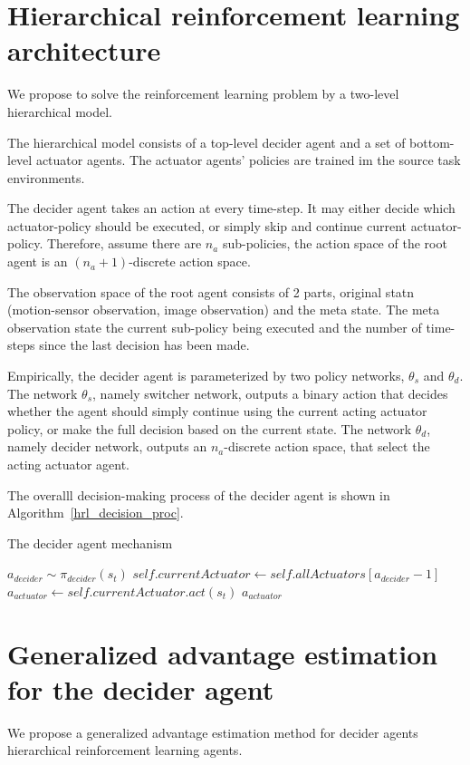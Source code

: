 
\section{Hierarchical reinforcement learning architecture}
We propose to solve the reinforcement learning problem by a two-level hierarchical model. 

The hierarchical model consists of a top-level decider agent and a set of bottom-level actuator agents. The actuator agents' policies are trained im the source task environments. 

The decider agent takes an action at every time-step. It may either decide which actuator-policy should be executed, or simply skip and continue current actuator-policy. Therefore, assume there are $n_a$ sub-policies, the action space of the root agent is an $(n_a+1)$-discrete action space.

The observation space of the root agent consists of 2 parts, original statn (motion-sensor observation, image observation) and the meta state. The meta observation state the current sub-policy being executed and the number of time-steps since the last decision has been made.

Empirically, the decider agent is parameterized by two policy networks, $\theta_s$ and $\theta_d$. The network $\theta_s$, namely switcher network, outputs a binary action that decides whether the agent should simply continue using the current acting actuator policy, or make the full decision based on the current state. 
The network $\theta_d$, namely decider network, outputs an $n_a$-discrete action space, that select the acting actuator agent. 

 The overalll decision-making process of the decider agent is shown in Algorithm~\ref{hrl_decision_proc}.

\begin{algorithm}
\caption{The decider agent mechanism}\label{hrl_decision_proc}
\begin{algorithmic}%
\State $a_{decider} \sim \pi_{decider}(s_t)$
 \State $self.currentActuator \gets self.allA
ctuators[a_{decider}-1]$
 \EndIf
\State $a_{actuator} \gets self.currentActuator.act(s_t)$
\State \Return $a_{actuator}$
\EndFunction
\end{algorithmic}
\end{algorithm}


\section{Generalized advantage estimation for the decider agent}
We propose a generalized advantage estimation method for decider agents hierarchical reinforcement learning agents. 

